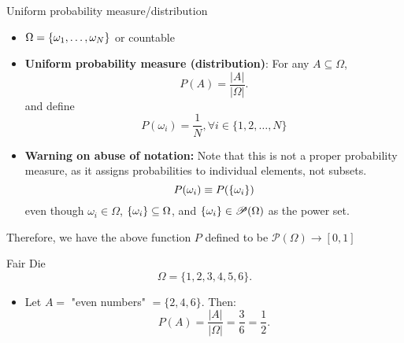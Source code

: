 \begin{df}{Uniform probability measure/distribution}
\begin{itemize}
    \item \(\Omega = \qty{\omega_1, \dots, \omega_N}\) or countable
    \item \textbf{Uniform probability measure (distribution)}:  
    For any \(A \subseteq \Omega\),  
    \[
    P(A) = \frac{|A|}{|\Omega|}.
    \]
    and define 
    \[P(\omega_i) = \frac{1}{N}, \forall i \in \{1, 2, \dots, N\}\] 
    \item \textbf{Warning on abuse of notation:} Note that this is not a proper probability measure, as it assigns probabilities to individual elements, not subsets.
    $$P(\omega_i) \equiv P(\qty{\omega_i})$$
    even though $\omega_i\in \Omega$, $\qty{\omega_i}\subseteq \Omega$, and $\qty{\omega_i} \in \mathscr{P}(\Omega)$ as the power set.
    	
\end{itemize}
Therefore, we have the above function $P$ defined to be $ \mathscr{P}(\Omega) \rightarrow [0, 1]$ 
\end{df}

\begin{eg}{Fair Die}
\[
\Omega = \{1, 2, 3, 4, 5, 6\}.
\]
\begin{itemize}
    \item Let \(A =\) "even numbers" \( = \{2, 4, 6\}\).  
    Then:
    \[
    P(A) = \frac{|A|}{|\Omega|} = \frac{3}{6} = \frac{1}{2}.
    \]
\end{itemize}
\end{eg}


